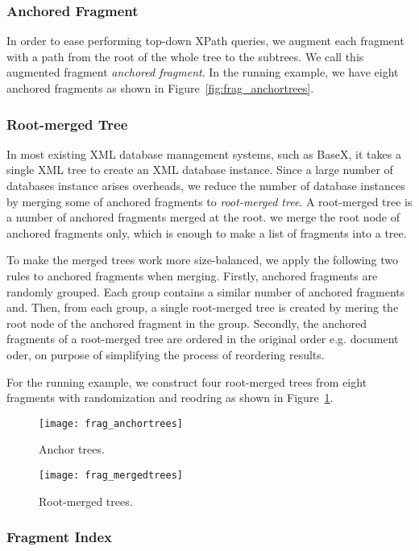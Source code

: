 \subsubsection{Anchored Fragment}

In order to ease performing top-down XPath queries, we augment each fragment
with a path from the root of the whole tree to the subtrees. We call this
augmented fragment \emph{anchored fragment}. In the running example, we have
eight anchored fragments as shown in Figure~\ref{fig:frag_anchortrees}.

\subsubsection{Root-merged Tree}

In most existing XML database management systems, such as BaseX, it takes a
single XML tree to create an XML database instance. Since a large number of
databases instance arises overheads, we reduce the number of database  instances
by merging some of anchored fragments to \emph{root-merged tree}. A root-merged
tree is a number of anchored fragments merged at the root. we merge the root
node of anchored fragments only, which is enough to make a list of fragments
into a tree. 

To make the merged trees work more size-balanced, we apply the following two
rules to anchored fragments when merging. Firstly, anchored fragments are
randomly grouped. Each group contains a similar number of anchored fragments
and. Then, from each group, a single root-merged tree is created by mering the
root node  of the anchored fragment in the group. Secondly, the anchored
fragments of a root-merged tree are ordered in the original order e.g. document
oder, on purpose of simplifying the process of reordering results.

For the running example, we construct four root-merged trees from eight
fragments with randomization and reodring as shown in
Figure~\ref{fig:frag_mergedtrees}. 

\begin{figure}[t]   
	\texttt{[image: frag\_anchortrees]}
	\caption{Anchor trees.}
	\label{fig:frag_anchortrees}	
	
	\texttt{[image: frag\_mergedtrees]}
	\caption{Root-merged trees.}
	\label{fig:frag_mergedtrees}
\end{figure}


\subsubsection{Fragment Index}


